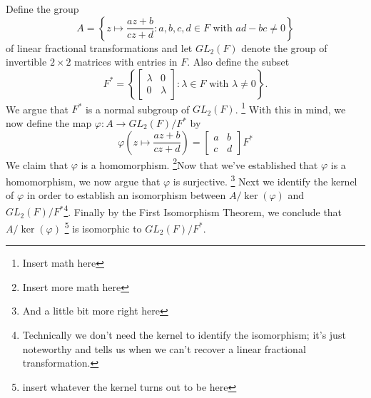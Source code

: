\documentclass[12pt]{article}
\newcommand{\lftmat}[4]{\begin{bmatrix} {#1} & {#2} \\ {#3} & {#4} \end{bmatrix}}
\newcommand{\stanlftmat}{\lftmat{a}{b}{c}{d}}
\theoremstyle{plain}
\theoremstyle{definition}
\begin{document}
\noindent Define the group
	\[
		A = \left\lbrace z\mapsto \frac{az + b}{cz + d}\colon a,b,c,d\in F\text{ with } ad - bc \neq 0\right\rbrace
	\]
of linear fractional transformations and let $GL_2(F)$ denote the group of invertible $2\times 2$ matrices with entries in $F$. Also define the subset
	\[
		F^* = \left\lbrace\lftmat{\lambda}{0}{0}{\lambda}\colon \lambda\in F\text{ with } \lambda\neq 0 \right\rbrace.
	\]
	We argue that $F^*$ is a normal subgroup of $GL_2(F)$. \footnote{Insert math here} With this in mind, we now define the map $\varphi\colon A\rightarrow GL_2(F)/F^*$ by
	\[
		\varphi\left(z\mapsto \frac{az + b}{cz + d}\right) = \stanlftmat F^*
	\]
	We claim that $\varphi$ is a homomorphism.  \footnote{Insert more math here}Now that we've established that $\varphi$ is a homomorphism, we now argue that $\varphi$ is surjective.  \footnote{And a little bit more right here}  Next we identify the kernel of $\varphi$ in order to establish an isomorphism between $A/\ker(\varphi)$ and $GL_2(F)/F^*$\footnote{Technically we don't need the kernel to identify the isomorphism; it's just noteworthy and tells us when we can't recover a linear fractional transformation.}. Finally by the First Isomorphism Theorem, we conclude that $A/\ker(\varphi)$ \footnote{insert whatever the kernel turns out to be here} is isomorphic to $GL_2(F)/F^*$. 
	
\end{document}
